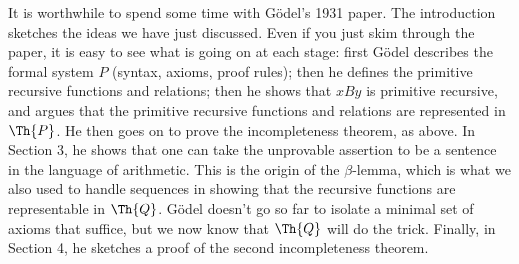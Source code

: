 \documentclass[../../../include/open-logic-section]{subfiles}
\begin{document}


It is worthwhile to spend some time with G\"odel's 1931
paper. The introduction sketches the ideas we have just discussed.
Even if you just skim through the paper, it is easy to see what is
going on at each stage: first G\"odel describes the formal system $P$
(syntax, axioms, proof rules); then he defines the primitive recursive
functions and relations; then he shows that $x B y$ is primitive
recursive, and argues that the primitive recursive functions and
relations are represented in $\Th{P}$. He then goes on to prove the
incompleteness theorem, as above. In Section 3, he shows that one can
take the unprovable assertion to be a sentence in the language of
arithmetic. This is the origin of the $\beta$-lemma, which is what we
also used to handle sequences in showing that the recursive functions
are representable in $\Th{Q}$. G\"odel doesn't go so far to isolate a
minimal set of axioms that suffice, but we now know that $\Th{Q}$ will do
the trick.  Finally, in Section 4, he sketches a proof of the second
incompleteness theorem.
\end{document}
